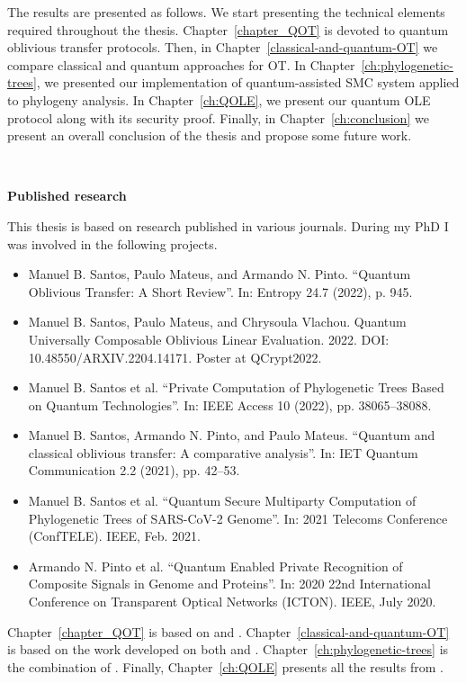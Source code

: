 The results are presented as follows. We start presenting the technical elements required throughout the thesis. Chapter~\ref{chapter_QOT} is devoted to quantum oblivious transfer protocols. Then, in Chapter~\ref{classical-and-quantum-OT} we compare classical and quantum approaches for OT. In Chapter~\ref{ch:phylogenetic-trees}, we presented our implementation of quantum-assisted SMC system applied to phylogeny analysis. In Chapter~\ref{ch:QOLE}, we present our quantum OLE protocol along with its security proof. Finally, in Chapter~\ref{ch:conclusion} we present an overall conclusion of the thesis and propose some future work.


\

\noindent\textbf{Published research}

This thesis is based on research published in various journals. During my PhD I was involved in the following projects.

\begin{itemize}
	\item\cite{SMP22} Manuel B. Santos, Paulo Mateus, and Armando N. Pinto. “Quantum Oblivious Transfer:
A Short Review”. In: Entropy 24.7 (2022), p. 945.

	\item\cite{SMV22} Manuel B. Santos, Paulo Mateus, and Chrysoula Vlachou. Quantum Universally
Composable Oblivious Linear Evaluation. 2022. DOI: 10.48550/ARXIV.2204.14171. Poster at QCrypt2022.

	\item\cite{SGPM22} Manuel B. Santos et al. “Private Computation of Phylogenetic Trees Based on Quantum
Technologies”. In: IEEE Access 10 (2022), pp. 38065–38088.

	\item\cite{SPM21} Manuel B. Santos, Armando N. Pinto, and Paulo Mateus. “Quantum and classical
oblivious transfer: A comparative analysis”. In: IET Quantum Communication 2.2 (2021), pp. 42–53.

	\item\cite{SGPM21} Manuel B. Santos et al. “Quantum Secure Multiparty Computation of Phylogenetic Trees of SARS-CoV-2 Genome”. In: 2021 Telecoms Conference (ConfTELE). IEEE, Feb. 2021.

    \item\cite{POS+20} Armando N. Pinto et al. “Quantum Enabled Private Recognition of Composite Signals
in Genome and Proteins”. In: 2020 22nd International Conference on Transparent Optical
Networks (ICTON). IEEE, July 2020. 
\end{itemize}

Chapter~\ref{chapter_QOT} is based on \cite{SMP22} and \cite{SGPM22}. Chapter~\ref{classical-and-quantum-OT} is based on the work developed on both \cite{SPM21} and \cite{SGPM22}. Chapter~\ref{ch:phylogenetic-trees} is the combination of \cite{SGPM22, SGPM21, POS+20}. Finally, Chapter~\ref{ch:QOLE} presents all the results from \cite{SMV22}. 

%
%
%
